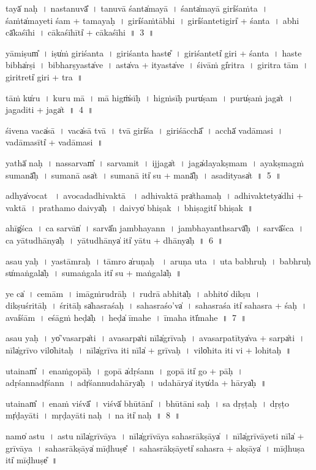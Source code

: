 \documentclass[parskip, DIV=14]{scrartcl}
\begin{document}
{tayā̍ naḥ~। na॒sta॒nuvā̎~। ta॒nuvā॒ śanta̍mayā~। śanta̍mayā॒ giri̍śaṁta~। śaṁta̍ma॒yeti śam + ta॒ma॒ya॒ḥ~।  giri̍śaṁtā॒bhi~। 
giri̍śa॒nteti॒giri̍ + śa॒nta॒~। a॒bhi cā̍kaśīhi~। cā॒ka॒śī॒hīti̍ + cākaśīhi~॥~3~॥

yāmiṣum̎~। iṣu̍ṁ giriśanta~। gi॒ri॒śa॒nta॒ haste̎~। gi॒ri॒śa॒nteti̍ giri + śa॒nta॒~। 
haste॒ bibha̍rṣi~। bibha॒rṣyasta̍ve~। asta̍va॒ + ityasta̍ve~।
śi॒vāṁ gi̍ritra~।  gi॒ri॒tra॒ tām~। gi॒ri॒treti̍ giri + tra॒~॥

tāṁ ku̍ru~। ku॒ru॒ mā~। mā higṁ̍sīḥ~। hi॒gṁ॒sī॒ḥ puru̍ṣam~।
puru̍ṣa॒ṁ jaga̍t~। ja॒ga॒diti॒ + jaga̍t~॥~4~॥

śi॒vena॒ vaca̍sā~। vaca̍sā tvā~। tvā॒ giri̍śa~। giri॒śācchā̎~। acchā̍ vadāmasi~।
va॒dāma॒sīti̍ + vadāmasi~॥ 

yathā̍ naḥ~। na॒ssarvam̎~। sarva॒mit~।
ijjaga̍t~। jaga̍daya॒kṣmam~। a॒ya॒kṣmagṁ su॒manā̎ḥ~। su॒manā॒ asa̍t~।
su॒manā॒ iti̍ su + manā̎ḥ~। a॒sa॒dityasa̍t~॥~5~॥

adhya̍vocat ~। a॒vo॒ca॒da॒dhi॒va॒ktā ~। a॒dhi॒va॒ktā pra̍tha॒maḥ~। a॒dhi॒va॒ktetya̍dhi + va॒ktā~।
pra॒tha॒mo daivya̍ḥ~। daivyo̍ bhi॒ṣak~। bhi॒ṣagiti̍ bhi॒ṣak~॥

a॒hīg̍śca~। ca॒ sarvān̍~। sarvā̎n ja॒mbhayann~। ja॒mbha॒ya॒nthsarvā̎ḥ~। sarvā̎śca~।
ca॒ yā॒tu॒dhā॒nya̍ḥ~। yā॒tu॒dhā॒nya̍ iti̍ yātu + dhā॒nya̍ḥ~॥~6~॥

a॒sau yaḥ~। yastā॒mraḥ~। tā॒mro a̍ru॒ṇaḥ ~। a॒ru॒ṇa u॒ta~। u॒ta॒ ba॒bhruḥ~।
ba॒bhruḥ su̍ma॒ṅgala̍ḥ~। su॒ma॒ṅgala॒ iti̍ su + ma॒ṅgala̍ḥ~॥

ye ca̍~। ce॒mām~।  i॒māgṁru॒drāḥ~। ru॒drā a॒bhita̍ḥ~। a॒bhito̍ di॒kṣu~। di॒kṣuśri॒tāḥ~।  
śri॒tāḥ sa̍hasra॒śaḥ~। sa॒ha॒sra॒śo'va̍~। sa॒ha॒sra॒śa iti̍ sahasra + śaḥ~। 
avai̍śām~। e॒śā॒gṁ॒ heḍa̍ḥ~। heḍa̍ īmahe~। ī॒ma॒ha॒ itī̍mahe~॥~7~॥

a॒sau yaḥ~। yo̍'va॒sarpa̍ti~। a॒va॒sarpa̍ti॒ nīla̍grīvaḥ~। a॒va॒sarpa॒tītya̍va + sarpa̍ti~। nīla̍grīvo॒ vilo̍hitaḥ~। nīla̍grīva॒ iti॒ nīla̍ + grī॒va॒ḥ~। vilo̍hita॒ iti॒ vi + lo॒hi॒ta॒ḥ~॥

u॒tainam̎~। e॒na॒ṁgo॒pāḥ~। go॒pā a̍dṛśann~। go॒pā iti̍ go + pāḥ~। a॒dṛ॒śa॒nnadṛ̍śann~। adṛ̍śannudahā॒rya̍ḥ~। u॒da॒hā॒rya̍ ityu̍da + hā॒rya̍ḥ~॥

u॒tainam̎~। e॒na॒ṁ viśvā̎~। viśvā̍ bhū॒tāni̍~। bhū॒tāni॒ saḥ~। sa dṛ॒ṣṭaḥ~। dṛ॒ṣṭo mṛ̍ḍayāti~। mṛ॒ḍa॒yā॒ti॒ na॒ḥ~। na॒ iti̍ naḥ~॥~8~॥

namo̍ astu~। a॒stu॒ nīla̍grīvāya~। nīla̍grīvāya sahasrā॒kṣāya̍~। nīla̍grīvā॒yeti॒ nīla̍ + grī॒vā॒ya॒~। sahasrā॒kṣāya̍ mī॒ḍhuṣe̎~। sa॒ha॒srā॒kṣāyeti̍ sahasra + a॒kṣāya̍~। mī॒ḍhuṣa॒ iti̍ mī॒ḍhuṣe̎~॥ 

}
\end{document}
